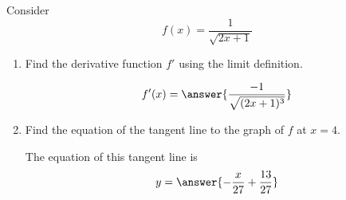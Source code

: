 \documentclass{ximera}
\author{Steven Gubkin}
\begin{document}
\begin{exercise}

Consider 
\[
f(x) = \frac{1}{\sqrt{2x+1}}
\]



\begin{enumerate}
\item Find the derivative function $f'$ using the limit definition.
\begin{prompt} 
\[
f'(x) = \answer{\frac{-1}{\sqrt{(2x+1)^3}}}
\]
\end{prompt}

\item  Find the equation of the tangent line to the graph of $f$ at $x=4$.

\begin{prompt} 
The equation of this tangent line is
$$ y = \answer{ -\frac{x}{27} + \frac{13}{27}}$$ 
\end{prompt}

\end{enumerate}

\end{exercise}
\end{document}

